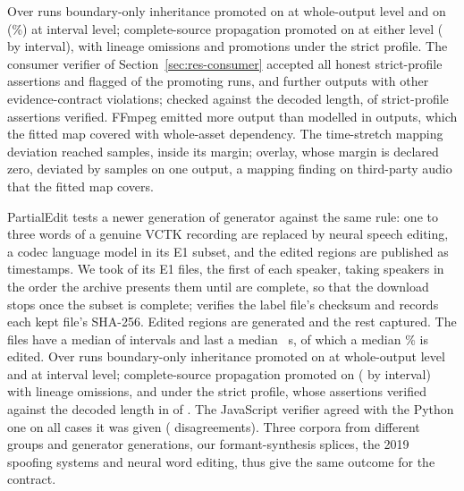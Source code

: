 \documentclass[preprint,3p,11pt,authoryear]{elsarticle}
\begin{document}
Over \Qruns{} runs boundary-only inheritance promoted on \Qbase{} at whole-output
level and on \Qeither{} (\QeitherPct{}\%) at interval level; complete-source
propagation promoted on \Qem{} at either level (\QemInterval{} by interval), with
\QemLineage{} lineage omissions and \Qstrict{} promotions under the strict profile. The consumer verifier of
Section~\ref{sec:res-consumer} accepted all \QconsHonest{} honest strict-profile
assertions and flagged \QconsFlagged{} of the \QconsPromo{} promoting runs, and
\QconsLocal{} further outputs with other evidence-contract violations; checked against the decoded
length, \QstrictVerified{} of \Qruns{} strict-profile assertions verified. FFmpeg emitted more output
than modelled in \QfallbackOutputs{} outputs, which the fitted map covered with
whole-asset dependency. The time-stretch mapping deviation reached
\QstretchDev{} samples, inside its margin; overlay, whose margin is declared
zero, deviated by \QoverlayDev{} samples on one output, a mapping finding on
third-party audio that the fitted map covers.

PartialEdit \citep{zhang2025partialedit,zhang2026partialeditdata} tests a newer
generation of generator against the same rule: one to three words of a genuine
VCTK recording \citep{yamagishi2019vctk} are replaced by neural speech editing, a
codec language model in its E1 subset, and the edited regions are published as
timestamps. We took \Rclips{} of its \RfilesTotal{} E1 files, the first \RperSpk{}
of each speaker, taking speakers in the order the archive presents them until
\Rspeakers{} are complete, so that the download stops once
the subset is complete;  verifies the label file's
checksum and records each kept file's SHA-256. Edited regions are generated and
the rest captured. The files have a median of \RmedIntervals{} intervals and last a median
\RmedDur{}~s, of which a median \RgenPct{}\% is edited. Over \Rruns{} runs
boundary-only inheritance promoted on \Rbase{} at whole-output level and \Reither{}
at interval level; complete-source propagation promoted on \Rem{} (\RemInterval{}
by interval) with \RemLineage{} lineage omissions, and \Rstrict{} under the strict
profile, whose assertions verified against the decoded length in
\RstrictVerified{} of \Rruns{}. The JavaScript verifier agreed with the Python one on
all \RjsCases{} cases it was given (\RjsDis{} disagreements). Three corpora from
different groups and generator generations, our formant-synthesis splices, the
2019 spoofing systems and neural word editing, thus give the same outcome for the
contract.
\end{document}
